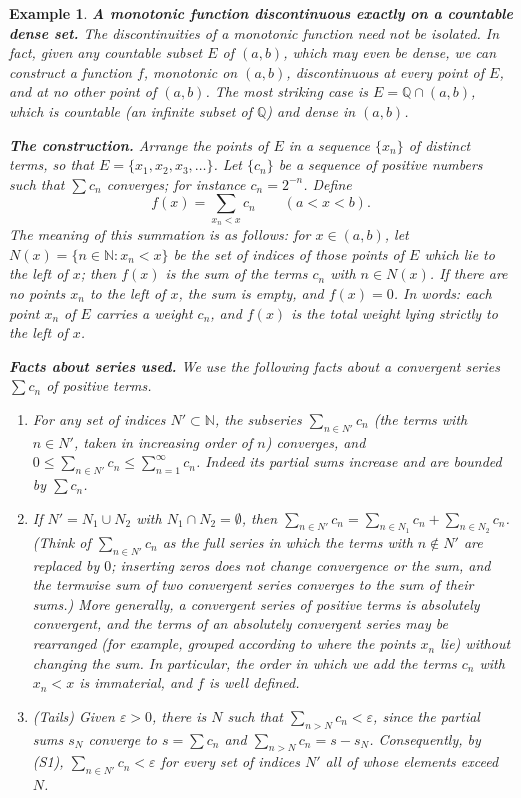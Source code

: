 \documentclass{article}
\theoremstyle{mythm}
\newtheorem{example}[theorem]{Example}
\begin{document}
\begin{example}\label{ex:densejumps}
\textbf{A monotonic function discontinuous exactly on a countable dense set.} The discontinuities of a monotonic function need not be isolated. In fact, given any countable subset $E$ of $(a,b)$, which may even be dense, we can construct a function $f$, monotonic on $(a,b)$, discontinuous at every point of $E$, and at no other point of $(a,b)$. The most striking case is $E = \mathbb{Q} \cap (a,b)$, which is countable (an infinite subset of $\mathbb{Q}$) and dense in $(a,b)$.

\textbf{The construction.} Arrange the points of $E$ in a sequence $\{x_n\}$ of distinct terms, so that $E = \{x_1, x_2, x_3, \dots\}$. Let $\{c_n\}$ be a sequence of positive numbers such that $\sum c_n$ converges; for instance $c_n = 2^{-n}$. Define
\[
f(x) = \sum_{x_n < x} c_n \qquad (a < x < b).
\]
The meaning of this summation is as follows: for $x \in (a,b)$, let $N(x) = \{n \in \mathbb{N} : x_n < x\}$ be the set of indices of those points of $E$ which lie to the left of $x$; then $f(x)$ is the sum of the terms $c_n$ with $n \in N(x)$. If there are no points $x_n$ to the left of $x$, the sum is empty, and $f(x) = 0$. In words: each point $x_n$ of $E$ carries a weight $c_n$, and $f(x)$ is the total weight lying strictly to the left of $x$.

\textbf{Facts about series used.} We use the following facts about a convergent series $\sum c_n$ of positive terms.
\begin{enumerate}[label=(S\arabic*)]
    \item For any set of indices $N' \subset \mathbb{N}$, the subseries $\sum_{n \in N'} c_n$ (the terms with $n \in N'$, taken in increasing order of $n$) converges, and $0 \leq \sum_{n\in N'} c_n \leq \sum_{n=1}^\infty c_n$. Indeed its partial sums increase and are bounded by $\sum c_n$.
    \item If $N' = N_1 \cup N_2$ with $N_1 \cap N_2 = \emptyset$, then $\sum_{n \in N'} c_n = \sum_{n \in N_1} c_n + \sum_{n\in N_2} c_n$. (Think of $\sum_{n\in N'} c_n$ as the full series in which the terms with $n \notin N'$ are replaced by $0$; inserting zeros does not change convergence or the sum, and the termwise sum of two convergent series converges to the sum of their sums.) More generally, a convergent series of positive terms is absolutely convergent, and the terms of an absolutely convergent series may be rearranged (for example, grouped according to where the points $x_n$ lie) without changing the sum. In particular, the order in which we add the terms $c_n$ with $x_n < x$ is immaterial, and $f$ is well defined.
    \item (Tails) Given $\varepsilon > 0$, there is $N$ such that $\sum_{n > N} c_n < \varepsilon$, since the partial sums $s_N$ converge to $s = \sum c_n$ and $\sum_{n>N} c_n = s - s_N$. Consequently, by (S1), $\sum_{n \in N'} c_n < \varepsilon$ for every set of indices $N'$ all of whose elements exceed $N$.
\end{enumerate}


\end{example}
\end{document}
